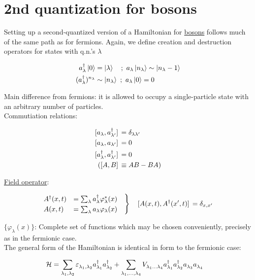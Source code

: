 \chapter{2nd quantization for bosons}

Setting up a second-quantized version of a Hamiltonian for \underline{bosons} follows much of the same path as for fermions. Again, we define creation and destruction operators for states with q.n.'s $\lambda$

\begin{align}
    a_\lambda^\dagger \ket{0} &= \ket{\lambda} \quad ; \ a_\lambda\ket{n_\lambda} \sim \ket{n_\lambda - 1} \\
    (a_\lambda^\dagger)^{n_\lambda} &\sim \ket{n_\lambda} \ ; \ a_\lambda\ket{0} = 0
\end{align}

Main difference from fermions: it is allowed to occupy a single-particle state with an arbitrary number of particles. \\  Commutiation relations:

\begin{align}
    \comm*{a_\lambda}{a_{\lambda'}^\dagger} &= \delta_{\lambda \lambda'} \\
    \comm*\Big{a_\lambda}{a_{\lambda'}} &= 0 \\
    \comm*{a_\lambda^\dagger}{a_{\lambda'}^\dagger} &= 0 \\ 
    (\comm*{A}{B} &\equiv AB - BA)
\end{align}

 \uline{Field operator}:

\begin{align}
    \begin{rcases}
    A^\dagger (x, t) &= \sum_\lambda a_\lambda^\dagger \varphi_\lambda^*(x) \quad \\
    A(x, t) &= \sum_\lambda a_\lambda \varphi_\lambda(x)
    \end{rcases}
    \quad
    \comm*{A(x,t)}{A^\dagger (x', t)} = \delta_{x, x'}
\end{align}

 $\{\varphi_\lambda(x)\}$: Complete set of functions which may be chosen conveniently, precisely as in the fermionic case. \\

 The general form of the Hamiltonian is identical in form to the fermionic case:

\begin{tcolorbox}
    \begin{align}
        \mathcal{H} &= \sum_{\lambda_1, \lambda_2} \varepsilon_{\lambda_1, \lambda_2}^{} a_{\lambda_1}^\dagger a_{\lambda_2}^\dagger
        + \sum_{\lambda_1, ..., \lambda_4}V_{\lambda_1 ... \lambda_4}^{}a_{\lambda_1}^\dagger a_{\lambda_2}^\dagger a_{\lambda_3}^{} a_{\lambda_4}^{}
    \end{align}
\end{tcolorbox}

